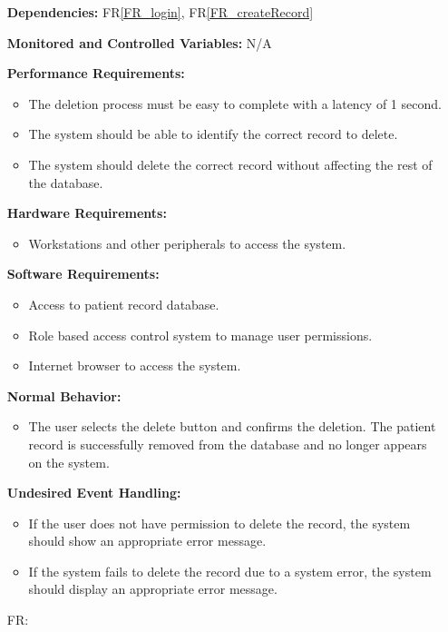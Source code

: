 \documentclass[12pt]{article}
\newcounter{reqnum} %
\begin{document}
\begin{itemize}
\textbf{Dependencies:} FR\ref{FR_login}, FR\ref{FR_createRecord}

\textbf{Monitored and Controlled Variables:} N/A

\textbf{Performance Requirements:} 
\begin{itemize}
  \item The deletion process must be easy to complete with a latency of 1 second. 
  \item The system should be able to identify the correct record to delete. 
  \item The system should delete the correct record without affecting the rest of the database. 
\end{itemize}

\textbf{Hardware Requirements:} 
\begin{itemize}
  \item Workstations and other peripherals to access the system.
\end{itemize}

\textbf{Software Requirements:} 
\begin{itemize}
  \item Access to patient record database.
  \item Role based access control system to manage user permissions.
  \item Internet browser to access the system.
\end{itemize}

\textbf{Normal Behavior:} 
\begin{itemize}
  \item The user selects the delete button and confirms the deletion. The patient record is successfully removed from the database and no longer appears on the system.
\end{itemize}

\textbf{Undesired Event Handling:} 
\begin{itemize}
  \item If the user does not have permission to delete the record, the system should show an appropriate error message.
  \item If the system fails to delete the record due to a system error, the system should display an appropriate error message. 
\end{itemize}



\item[FR\refstepcounter{reqnum}\thereqnum \label{FR_updateRecordtyping}:]


\end{itemize}
\end{document}
